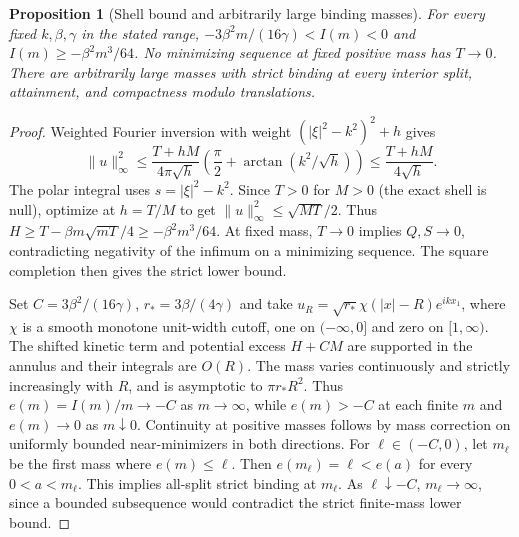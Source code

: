 \documentclass[11pt]{article}
\numberwithin{equation}{section}
\newtheorem{proposition}[theorem]{Proposition}
\theoremstyle{remark}
\begin{document}
\begin{proposition}[Shell bound and arbitrarily large binding masses]
For every fixed $k,\beta,\gamma$ in the stated range,
$-3\beta^2m/(16\gamma)< I(m)<0$ and $I(m)\ge-\beta^2m^3/64$.
No minimizing sequence at fixed positive mass has $T\to0$.
There are arbitrarily large masses with strict binding at every
interior split, attainment, and compactness modulo translations.
\end{proposition}
\begin{proof}
Weighted Fourier inversion with weight $(|\xi|^2-k^2)^2+h$ gives
\[
\|u\|_\infty^2\le\frac{T+hM}{4\pi\sqrt h}
\left(\frac\pi2+\arctan(k^2/\sqrt h)\right)
\le\frac{T+hM}{4\sqrt h}.
\]
The polar integral uses $s=|\xi|^2-k^2$. Since $T>0$ for $M>0$
(the exact shell is null), optimize at $h=T/M$ to get
$\|u\|_\infty^2\le\sqrt{MT}/2$. Thus
$H\ge T-\beta m\sqrt{mT}/4\ge-\beta^2m^3/64$.
At fixed mass, $T\to0$ implies $Q,S\to0$, contradicting negativity
of the infimum on a minimizing sequence. The square completion then
gives the strict lower bound.

Set $C=3\beta^2/(16\gamma)$, $r_*=3\beta/(4\gamma)$ and take
$u_R=\sqrt{r_*}\chi(|x|-R)e^{ikx_1}$, where $\chi$ is a smooth monotone
unit-width cutoff, one on $(-\infty,0]$ and zero on $[1,\infty)$.
The shifted kinetic term and potential excess $H+CM$ are supported
in the annulus and their integrals are $O(R)$.
The mass varies continuously and strictly increasingly with $R$,
and is asymptotic to $\pi r_*R^2$. Thus $e(m)=I(m)/m\to-C$ as
$m\to\infty$, while $e(m)>-C$ at each finite $m$ and $e(m)\to0$
as $m\downarrow0$. Continuity at positive masses follows by mass
correction on uniformly bounded near-minimizers in both directions.
For $\ell\in(-C,0)$, let $m_\ell$ be the first mass where
$e(m)\le\ell$. Then $e(m_\ell)=\ell<e(a)$ for every $0<a<m_\ell$.
This implies all-split strict binding at $m_\ell$. As $\ell\downarrow-C$,
$m_\ell\to\infty$, since a bounded subsequence would contradict
the strict finite-mass lower bound.
\end{proof}
\end{document}
